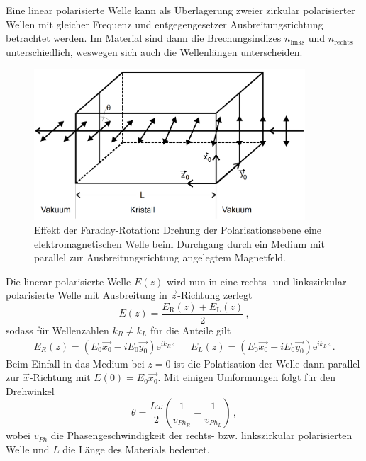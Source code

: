 Eine linear polarisierte Welle kann als Überlagerung zweier zirkular polarisierter Wellen mit gleicher Frequenz
und entgegengesetzer Ausbreitungsrichtung betrachtet werden. Im Material sind dann die Brechungsindizes $n_\text{links}$ 
und $n_\text{rechts}$ unterschiedlich, weswegen sich auch die Wellenlängen unterscheiden.
\FloatBarrier
\begin{figure}[h]
    \centering
    \includegraphics[width=0.9\textwidth]{rotation.png}
    \caption{Effekt der Faraday-Rotation: Drehung der Polarisationsebene eine elektromagnetischen Welle beim Durchgang durch ein Medium mit parallel zur Ausbreitungsrichtung angelegtem Magnetfeld.}
    \label{fig:tfig2}
\end{figure}
\FloatBarrier
\noindent
Die linerar polarisierte Welle $E(z)$ wird nun in eine rechts- und linkszirkular polarisierte Welle mit Ausbreitung in 
$\vec{z}$-Richtung zerlegt
\begin{equation*}
    E(z) = \frac{E_\text{R}\left(z\right) + E_\text{L}\left(z\right)}{2} \, ,
\end{equation*}
sodass für Wellenzahlen $k_R \neq k_L$ für die Anteile gilt
\begin{align*}
    E_R (z) = \left(E_0 \vec{x_0} - i E_0 \vec{y_0}\right) \text{e}^{i k_R z} && E_L (z) = \left(E_0 \vec{x_0} + i E_0 \vec{y_0}\right) \text{e}^{i k_L z} \, .
\end{align*}
Beim Einfall in das Medium bei $z = 0$ ist die Polatisation der Welle dann parallel zur $\vec{x}$-Richtung mit $E(0) = E_0 \vec{x_0}$.
Mit einigen Umformungen folgt für den Drehwinkel
\begin{equation*}
    \theta = \frac{L \omega}{2} \left(\frac{1}{v_{Ph_R}} - \frac{1}{v_{Ph_L}}\right) \, ,
\end{equation*}
wobei $v_{Ph}$ die Phasengeschwindigkeit der rechts- bzw. linkszirkular polarisierten Welle und $L$ die Länge des Materials
bedeutet. 
